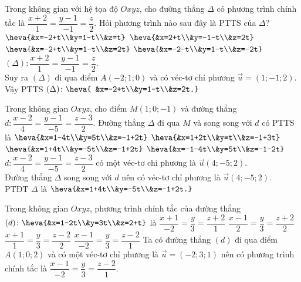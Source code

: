\begin{ex}%
	Trong không gian với hệ tọa độ $O x y z$, cho đường thẳng $\Delta$ có phương trình chính tắc là $\dfrac{x+2}{1}=\dfrac{y-1}{-1}=\dfrac{z}{2}$. Hỏi phương trình nào sau đây là PTTS của $\Delta$?
	\choice 
	{$\heva{&x=-2+t\\&y=1-t\\&z=t}$}
		{$\heva{&x=2+t\\&y=-1-t\\&z=2t}$}
			{\True $\heva{&x=-2+t\\&y=1-t\\&z=2t}$}
				{$\heva{&x=-2-t\\&y=1-t\\&z=-2t}$}
					\loigiai 
					{
$(\Delta)\colon \dfrac{x+2}{1}=\dfrac{y-1}{-1}=\dfrac{z}{2}$.\\
Suy ra $(\Delta)$ đi qua điểm $A(-2;1;0)$ và có véc-tơ chỉ phương $\vec{u}=(1;-1;2)$.\\
Vậy PTTS $(\Delta)\colon \heva{ &x=-2+t\\&y=1-t\\&z=2t.}$
					}
\end{ex}

\begin{ex}%
	Trong không gian $O x y z$, cho điểm $M(1;0;-1)$ và đường thẳng $d\colon\dfrac{x-2}{4}=\dfrac{y-1}{-5}=\dfrac{z-3}{2}$. Đường thẳng $\Delta$ đi qua $M$ và song song với $d$ có PTTS là 
	\choice 
	{$\heva{&x=1-4t\\&y=5t\\&z=-1+2t}$}
		{$\heva{&x=1+2t\\&y=t\\&z=-1+3t}$}
			{\True $\heva{&x=1+4t\\&y=-5t\\&z=-1+2t}$}
				{$\heva{&x=-1-4t\\&y=5t\\&z=-1-2t}$}
					\loigiai 
					{
$d\colon\dfrac{x-2}{4}=\dfrac{y-1}{-5}=\dfrac{z-3}{2}$ có một véc-tơ chỉ phương là $\vec{u}(4;-5;2)$.\\
Đường thẳng $\Delta$ song song với $d$ nên có véc-tơ chỉ phương là $\vec{u}(4;-5;2)$.\\
PTĐT $\Delta$ là $\heva{&x=1+4t\\&y=-5t\\&z=-1+2t.}$
					}
				\end{ex}
			
\begin{ex}%
	Trong không gian $O x y z$, phương trình chính tắc của đường thẳng $(d)\colon\heva{&x=1-2t\\&y=3t\\&z=2+t}$ là 
		\choice 
		{$\dfrac{x+1}{-2}=\dfrac{y}{3}=\dfrac{z+2}{1}$}
		{$\dfrac{x-1}{2}=\dfrac{y}{3}=\dfrac{z+2}{2}$}
		{$\dfrac{x+1}{1}=\dfrac{y}{3}=\dfrac{z-2}{2}$}
		{\True $\dfrac{x-1}{-2}=\dfrac{y}{3}=\dfrac{z-2}{1}$}
		\loigiai 
		{
	Ta có đường thẳng $(d)$ đi qua điểm $A(1;0;2)$ và có một véc-tơ chỉ phương là $\vec{u}=(-2;3;1)$ nên có phương trình chính tắc là $\dfrac{x-1}{-2}=\dfrac{y}{3}=\dfrac{z-2}{1}$.
		}
	\end{ex}

